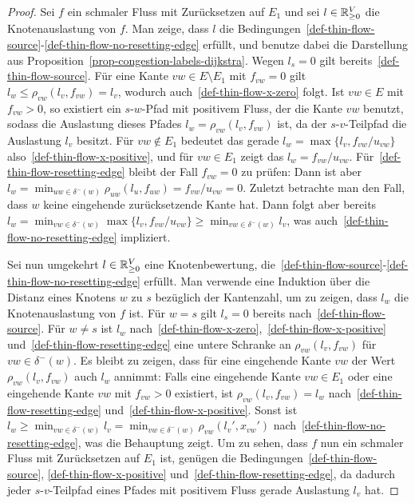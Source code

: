 \begin{proof}
	Sei $f$ ein schmaler Fluss mit Zurücksetzen auf $E_1$ und sei $l\in\mathbb{R}_{\geq 0}^V$ die Knotenauslastung von $f$.
	Man zeige, dass $l$ die Bedingungen~\ref{def-thin-flow-source}-\ref{def-thin-flow-no-resetting-edge} erfüllt, und benutze dabei die Darstellung aus Proposition~\ref{prop-congestion-labels-dijkstra}.
	Wegen $l_s = 0$ gilt bereits~\ref{def-thin-flow-source}.
	Für eine Kante $vw\in E\setminus E_1$ mit $f_{vw}=0$ gilt $l_w\leq \rho_{vw}(l_v, f_{vw}) = l_v$, wodurch auch~\ref{def-thin-flow-x-zero} folgt.
	Ist $vw\in E$ mit $f_{vw} > 0$, so existiert ein $s$-$w$-Pfad mit positivem Fluss, der die Kante $vw$ benutzt, sodass die Auslastung dieses Pfades $l_w=\rho_{vw}(l_v, f_{vw})$ ist, da der $s$-$v$-Teilpfad die Auslastung $l_v$ besitzt.
	Für $vw\notin E_1$ bedeutet das gerade $l_w = \max\{ l_v, f_{vw}/u_{vw} \}$ also~\ref{def-thin-flow-x-positive}, und für $vw\in E_1$ zeigt das $l_w = f_{vw} / u_{vw}$.
	Für~\ref{def-thin-flow-resetting-edge} bleibt der Fall $f_{vw} = 0$ zu prüfen:
	Dann ist aber $l_w = \min_{uw\in\delta^-(w)} \rho_{uw}(l_u, f_{uw}) = f_{vw} / u_{vw} = 0$.
	Zuletzt betrachte man den Fall, dass $w$ keine eingehende zurücksetzende Kante hat.
	Dann folgt aber bereits $l_w = \min_{vw\in \delta^-(w)} \max\{ l_v, f_{vw} / u_{vw} \} \geq \min_{vw\in\delta^-(w)} l_v$, was auch~\ref{def-thin-flow-no-resetting-edge} impliziert.
	
	Sei nun umgekehrt $l\in\mathbb{R}_{\geq 0}^V$ eine Knotenbewertung, die~\ref{def-thin-flow-source}-\ref{def-thin-flow-no-resetting-edge} erfüllt.
	Man verwende eine Induktion über die Distanz eines Knotens $w$ zu $s$ bezüglich der Kantenzahl, um zu zeigen, dass $l_w$ die Knotenauslastung von  $f$ ist.
	Für $w=s$ gilt $l_s=0$ bereits nach~\ref{def-thin-flow-source}.
	Für $w\neq s$ ist $l_w$ nach~\ref{def-thin-flow-x-zero},~\ref{def-thin-flow-x-positive} und~\ref{def-thin-flow-resetting-edge} eine untere Schranke an $\rho_{vw}(l_v, f_{vw})$ für $vw\in\delta^-(w)$.
	Es bleibt zu zeigen, dass für eine eingehende Kante $vw$ der Wert $\rho_{vw}(l_v, f_{vw})$ auch $l_w$ annimmt:
	Falls eine eingehende Kante $vw\in E_1$ oder eine eingehende Kante $vw$ mit $f_{vw} > 0$ existiert, ist $\rho_{vw}(l_v, f_{vw}) = l_w$ nach~\ref{def-thin-flow-resetting-edge} und~\ref{def-thin-flow-x-positive}.
	Sonst ist $l_w\geq \min_{vw\in \delta^-(w)} l_v = \min_{vw\in \delta^-(w)} \rho_{vw}(l_v', x_{vw}')$ nach~\ref{def-thin-flow-no-resetting-edge}, was die Behauptung zeigt.
	Um zu sehen, dass $f$ nun ein schmaler Fluss mit Zurücksetzen auf $E_1$ ist, genügen die Bedingungen~\ref{def-thin-flow-source}, \ref{def-thin-flow-x-positive} und~\ref{def-thin-flow-resetting-edge}, da dadurch jeder $s$-$v$-Teilpfad eines Pfades mit positivem Fluss gerade Auslastung $l_v$ hat.
\end{proof}

